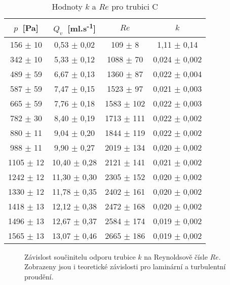 \begin{table}[htbp]
\centering
\begin{tabular}{|cccc|}
\hline 
$p$~[Pa]  &  $Q_v$~[ml.s\textsuperscript{-1}]  & $Re$ & $k$ \\ \hline
 156 $\pm$ 10 & 0,53 $\pm$ 0,02 & 109 $\pm$ 8 & 1,11 $\pm$ 0,14\\ 
 342 $\pm$ 10 & 5,33 $\pm$ 0,12 & 1088 $\pm$ 70 & 0,024 $\pm$ 0,002\\ 
 489 $\pm$ 59 & 6,67 $\pm$ 0,13 & 1360 $\pm$ 87 & 0,022 $\pm$ 0,004\\ 
 587 $\pm$ 59 & 7,47 $\pm$ 0,15 & 1523 $\pm$ 97 & 0,021 $\pm$ 0,003\\ 
 665 $\pm$ 59 & 7,76 $\pm$ 0,18 & 1583 $\pm$ 102 & 0,022 $\pm$ 0,003\\ 
 782 $\pm$ 30 & 8,40 $\pm$ 0,19 & 1713 $\pm$ 111 & 0,022 $\pm$ 0,002\\ 
 880 $\pm$ 11 & 9,04 $\pm$ 0,20 & 1844 $\pm$ 119 & 0,022 $\pm$ 0,002\\ 
 988 $\pm$ 11 & 9,90 $\pm$ 0,27 & 2019 $\pm$ 134 & 0,020 $\pm$ 0,002\\ 
 1105 $\pm$ 12 & 10,40 $\pm$ 0,28 & 2121 $\pm$ 141 & 0,021 $\pm$ 0,002\\ 
 1242 $\pm$ 12 & 11,30 $\pm$ 0,30 & 2305 $\pm$ 152 & 0,020 $\pm$ 0,002\\ 
 1330 $\pm$ 12 & 11,78 $\pm$ 0,35 & 2402 $\pm$ 161 & 0,020 $\pm$ 0,002\\ 
 1418 $\pm$ 13 & 12,12 $\pm$ 0,38 & 2472 $\pm$ 168 & 0,020 $\pm$ 0,002\\ 
 1496 $\pm$ 13 & 12,67 $\pm$ 0,37 & 2584 $\pm$ 174 & 0,019 $\pm$ 0,002\\ 
 1565 $\pm$ 13 & 13,07 $\pm$ 0,46 & 2665 $\pm$ 186 & 0,019 $\pm$ 0,002\\ 
\hline
\end{tabular}
\caption{Hodnoty $k$ a $Re$ pro trubici C}
\label{tab:kReC}
\end{table}



\begin{figure}[htbp] 
\centering

\caption{Závislost součinitelu odporu trubice $k$ na Reynoldsově čísle $Re$. Zobrazeny jsou i teoretické závislosti pro laminární a turbulentní proudění.}
\label{graf:k_na_Re}
\end{figure}













